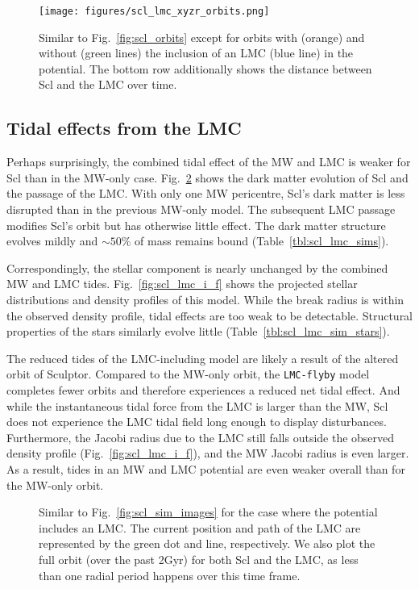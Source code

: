 \begin{figure}
\centering
\texttt{[image: figures/scl\_lmc\_xyzr\_orbits.png]}
\caption[Sculptor orbits with LMC]{Similar to Fig.~\ref{fig:scl_orbits}
except for orbits with (orange) and without (green lines) the inclusion
of an LMC (blue line) in the potential. The bottom row additionally
shows the distance between Scl and the LMC over
time.}\label{fig:scl_lmc_orbits_effect}
\end{figure}

\subsection{Tidal effects from the
LMC}\label{tidal-effects-from-the-lmc}

Perhaps surprisingly, the combined tidal effect of the MW and LMC is
weaker for Scl than in the MW-only case.
Fig.~\ref{fig:scl_lmc_sim_images} shows the dark matter evolution of Scl
and the passage of the LMC. With only one MW pericentre, Scl's dark
matter is less disrupted than in the previous MW-only model. The
subsequent LMC passage modifies Scl's orbit but has otherwise little
effect. The dark matter structure evolves mildly and \(\sim 50\%\) of
mass remains bound (Table~\ref{tbl:scl_lmc_sims}).

Correspondingly, the stellar component is nearly unchanged by the
combined MW and LMC tides. Fig.~\ref{fig:scl_lmc_i_f} shows the
projected stellar distributions and density profiles of this model.
While the break radius is within the observed density profile, tidal
effects are too weak to be detectable. Structural properties of the
stars similarly evolve little (Table~\ref{tbl:scl_lmc_sim_stars}).

The reduced tides of the LMC-including model are likely a result of the
altered orbit of Sculptor. Compared to the MW-only \smallperi{} orbit,
the \texttt{LMC-flyby} model completes fewer orbits and therefore
experiences a reduced net tidal effect. And while the instantaneous
tidal force from the LMC is larger than the MW, Scl does not experience
the LMC tidal field long enough to display disturbances. Furthermore,
the Jacobi radius due to the LMC still falls outside the observed
density profile (Fig.~\ref{fig:scl_lmc_i_f}), and the MW Jacobi radius
is even larger. As a result, tides in an MW and LMC potential are even
weaker overall than for the MW-only orbit.

\begin{figure}
\centering
{}
\caption[Sculptor simulation snapshots with LMC]{Similar to
Fig.~\ref{fig:scl_sim_images} for the case where the potential includes
an LMC. The current position and path of the LMC are represented by the
green dot and line, respectively. We also plot the full orbit (over the
past 2Gyr) for both Scl and the LMC, as less than one radial period
happens over this time frame.}\label{fig:scl_lmc_sim_images}
\end{figure}


